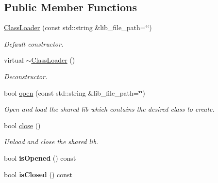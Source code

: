 \subsection*{Public Member Functions}
\begin{DoxyCompactItemize}
\item 
\hyperlink{classow__plugin__loader_1_1ClassLoader_a0177c32694bbc89df4f1820a407a90ba}{Class\+Loader} (const std\+::string \&lib\+\_\+file\+\_\+path=\char`\"{}\char`\"{})\hypertarget{classow__plugin__loader_1_1ClassLoader_a0177c32694bbc89df4f1820a407a90ba}{}\label{classow__plugin__loader_1_1ClassLoader_a0177c32694bbc89df4f1820a407a90ba}

\begin{DoxyCompactList}\small\item\em Default constructor. \end{DoxyCompactList}\item 
virtual \hyperlink{classow__plugin__loader_1_1ClassLoader_a8c85ba871c8a9caf9734eaf5111bee63}{$\sim$\+Class\+Loader} ()\hypertarget{classow__plugin__loader_1_1ClassLoader_a8c85ba871c8a9caf9734eaf5111bee63}{}\label{classow__plugin__loader_1_1ClassLoader_a8c85ba871c8a9caf9734eaf5111bee63}

\begin{DoxyCompactList}\small\item\em Deconstructor. \end{DoxyCompactList}\item 
bool \hyperlink{classow__plugin__loader_1_1ClassLoader_a9e03eaa5b9617b51bf7942b70153fa17}{open} (const std\+::string \&lib\+\_\+file\+\_\+path=\char`\"{}\char`\"{})
\begin{DoxyCompactList}\small\item\em Open and load the shared lib which contains the desired class to create. \end{DoxyCompactList}\item 
bool \hyperlink{classow__plugin__loader_1_1ClassLoader_ae1b7d5da12b27e6ffbf34b9b8242e4f1}{close} ()
\begin{DoxyCompactList}\small\item\em Unload and close the shared lib. \end{DoxyCompactList}\item 
bool {\bfseries is\+Opened} () const \hypertarget{classow__plugin__loader_1_1ClassLoader_a6fc48740bceb814da7af5ccdfe5ec6bb}{}\label{classow__plugin__loader_1_1ClassLoader_a6fc48740bceb814da7af5ccdfe5ec6bb}

\item 
bool {\bfseries is\+Closed} () const \hypertarget{classow__plugin__loader_1_1ClassLoader_a32af91737fb08d8d40007ed9e8ad7acb}{}\label{classow__plugin__loader_1_1ClassLoader_a32af91737fb08d8d40007ed9e8ad7acb}


\end{DoxyCompactItemize}
